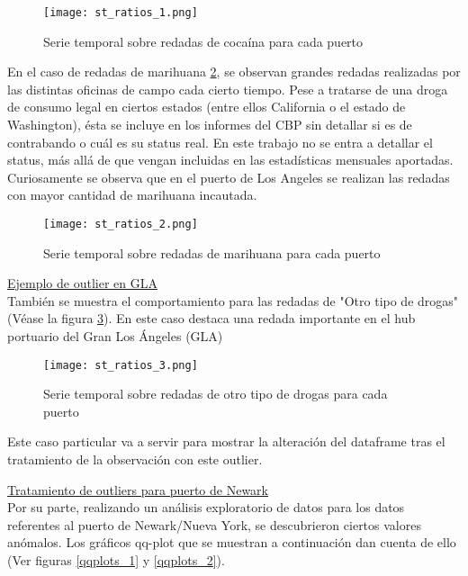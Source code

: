 \documentclass[12pt]{article}
\begin{document}
		\begin{figure}[H]
			\caption{\label{st_ratio_1} Serie temporal sobre redadas de cocaína para cada puerto}
			\centering
			\hspace*{1cm}
			\texttt{[image: st\_ratios\_1.png]}
		\end{figure}
	
		En el caso de redadas de marihuana \ref{st_ratio_2}, se observan grandes redadas realizadas por las distintas oficinas de campo cada cierto tiempo. Pese a tratarse de una droga de consumo legal en ciertos estados (entre ellos California o el estado de Washington), ésta se incluye en los informes del CBP sin detallar si es de contrabando o cuál es su status real. En este trabajo no se entra a detallar el status, más allá de que vengan incluidas en las estadísticas mensuales aportadas. Curiosamente se observa que en el puerto de Los Angeles se realizan las redadas con mayor cantidad de marihuana incautada.
		
		\begin{figure}[H]
			\caption{\label{st_ratio_2} Serie temporal sobre redadas de marihuana para cada puerto}
			\centering
			\hspace*{1cm}
			\texttt{[image: st\_ratios\_2.png]}
		\end{figure}
	
	
		\underline{Ejemplo de outlier en GLA}\\
		También se muestra el comportamiento para las redadas de "Otro tipo de drogas" (Véase la figura \ref{st_ratio_3}). En este caso destaca una redada importante en el hub portuario del Gran Los Ángeles (GLA)
		
		\begin{figure}[H]
			\caption{\label{st_ratio_3} Serie temporal sobre redadas de otro tipo de drogas para cada puerto}
			\centering
			\hspace*{1cm}
			\texttt{[image: st\_ratios\_3.png]}
		\end{figure}
	
		Este caso particular va a servir para mostrar la alteración del dataframe tras el tratamiento de la observación con este outlier.
		
		\underline{Tratamiento de outliers para puerto de Newark}\\
		Por su parte, realizando un análisis exploratorio de datos para los datos referentes al puerto de Newark/Nueva York, se descubrieron ciertos valores anómalos. Los gráficos qq-plot que se muestran a continuación dan cuenta de ello (Ver figuras \ref{qqplots_1} y \ref{qqplots_2}).
		
\end{document}
